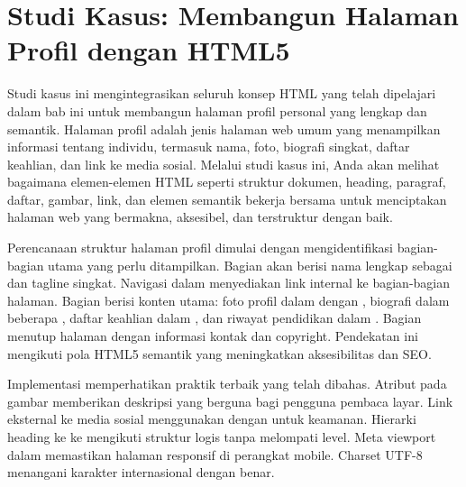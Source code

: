 \section{Studi Kasus: Membangun Halaman Profil dengan HTML5}

Studi kasus ini mengintegrasikan seluruh konsep HTML yang telah dipelajari dalam bab ini untuk membangun halaman profil personal yang lengkap dan semantik. Halaman profil adalah jenis halaman web umum yang menampilkan informasi tentang individu, termasuk nama, foto, biografi singkat, daftar keahlian, dan link ke media sosial. Melalui studi kasus ini, Anda akan melihat bagaimana elemen-elemen HTML seperti struktur dokumen, heading, paragraf, daftar, gambar, link, dan elemen semantik bekerja bersama untuk menciptakan halaman web yang bermakna, aksesibel, dan terstruktur dengan baik.

Perencanaan struktur halaman profil dimulai dengan mengidentifikasi bagian-bagian utama yang perlu ditampilkan. Bagian  akan berisi nama lengkap sebagai  dan tagline singkat. Navigasi dalam  menyediakan link internal ke bagian-bagian halaman. Bagian  berisi konten utama: foto profil dalam  dengan , biografi dalam beberapa , daftar keahlian dalam , dan riwayat pendidikan dalam . Bagian  menutup halaman dengan informasi kontak dan copyright. Pendekatan ini mengikuti pola HTML5 semantik yang meningkatkan aksesibilitas dan SEO.

Implementasi memperhatikan praktik terbaik yang telah dibahas. Atribut  pada gambar memberikan deskripsi yang berguna bagi pengguna pembaca layar. Link eksternal ke media sosial menggunakan  dengan  untuk keamanan. Hierarki heading  ke  ke  mengikuti struktur logis tanpa melompati level. Meta viewport dalam  memastikan halaman responsif di perangkat mobile. Charset UTF-8 menangani karakter internasional dengan benar.

